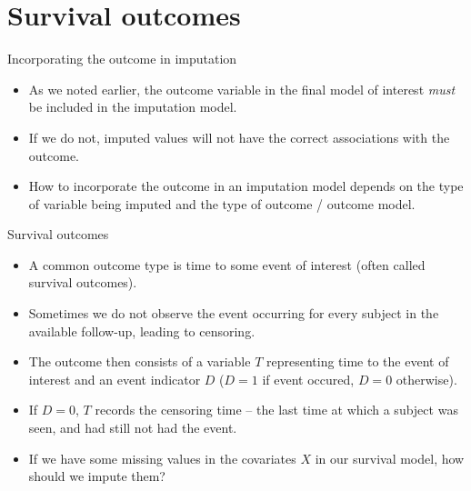 \documentclass[ignorenonframetext,]{beamer}
\providecommand{\tightlist}{%
  \setlength{\itemsep}{0pt}\setlength{\parskip}{0pt}}
\begin{document}
\hypertarget{survival-outcomes}{%
\section{Survival outcomes}\label{survival-outcomes}}

\begin{frame}{Incorporating the outcome in imputation}
\protect\hypertarget{incorporating-the-outcome-in-imputation}{}

\begin{itemize}
\tightlist
\item
  As we noted earlier, the outcome variable in the final model of
  interest \emph{must} be included in the imputation model.
\item
  If we do not, imputed values will not have the correct associations
  with the outcome.
\item
  How to incorporate the outcome in an imputation model depends on the
  type of variable being imputed and the type of outcome / outcome
  model.
\end{itemize}

\end{frame}

\begin{frame}{Survival outcomes}
\protect\hypertarget{survival-outcomes-1}{}

\begin{itemize}
\tightlist
\item
  A common outcome type is time to some event of interest (often called
  survival outcomes).
\item
  Sometimes we do not observe the event occurring for every subject in
  the available follow-up, leading to censoring.
\item
  The outcome then consists of a variable \(T\) representing time to the
  event of interest and an event indicator \(D\) (\(D=1\) if event
  occured, \(D=0\) otherwise).
\item
  If \(D=0\), \(T\) records the censoring time -- the last time at which
  a subject was seen, and had still not had the event.
\item
  If we have some missing values in the covariates \(X\) in our survival
  model, how should we impute them?
\end{itemize}

\end{frame}
\end{document}
